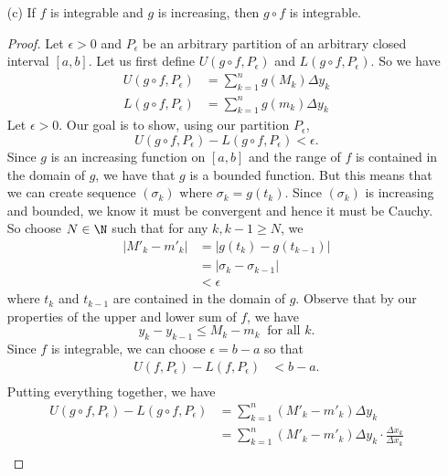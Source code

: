 \begin{enumerate}
	\item[(c)] If \( f  \) is integrable and \( g  \) is increasing, then \( g \circ f  \) is integrable.
		\begin{proof}
			Let \( \epsilon > 0 \) and \( P_{\epsilon } \) be an arbitrary partition of an arbitrary closed interval \( [a,b] \). Let us first define \( U(g \circ f , P_{\epsilon }) \) and \( L(g \circ f, P_{\epsilon }) \). So we have 
		\begin{align*}
		    U(g \circ f, P_{\epsilon }) &= \sum_{ k=1 }^{ n } g(M_{k}) \Delta y_{ k }   \\
							L(g \circ f, P_{\epsilon })			&= \sum_{ k=1 }^{ n } g(m_{k }) \Delta y_{k }
		\end{align*}
 Let \( \epsilon > 0  \).  Our goal is to show, using our partition \( P_{\epsilon } \), 
		\[ U(g \circ f, P_{\epsilon }) - L(g \circ f, P_{\epsilon }) < \epsilon.  \] Since \( g  \) is an increasing function on \( [a,b] \) and the range of \( f  \) is contained in the domain of \( g  \), we have that \( g  \) is a bounded function. But this means that we can create sequence \( (\sigma_{k } ) \) where \( \sigma_{k } = g(t_{k }) \). Since \( (\sigma_{k }) \) is increasing and bounded, we know it must be convergent and hence it must be Cauchy. So choose \( N \in \N  \) such that for any \( k,k-1 \geq N  \), we 
		\begin{align*}
		    | M'_{k} - m'_{k}   | &= | g(t_{k}) - g(t_{k-1}) | \\ 
								  &= | \sigma_{k} - \sigma_{k-1} | \\ 
									   &< \epsilon
		\end{align*}
		where \( t_{k} \) and \( t_{k-1}  \) are contained in the domain of \( g \).
	Observe that by our properties of the upper and lower sum of \( f  \), we have 
	\[ y_{k} - y_{k-1} \leq M_{k} - m_{k } \ \text{ for all } k.  \]
	Since \( f  \) is integrable, we can choose \( \epsilon = b -a  \) so that
	\begin{align*}
	    U(f, P_{\epsilon }) - L(f, P_{\epsilon }) &< b - a . \\
	\end{align*}
	Putting everything together, we have 
	\begin{align*}
	    U(g \circ f, P_{\epsilon }) - L(g \circ f, P_{\epsilon }) &= \sum_{ k=1 }^{ n } (M'_{k} - m'_{k}) \Delta y_{k} \\
								&= \sum_{ k=1 }^{ n } (M'_{k} - m'_{k }) \Delta y_{k} \cdot  \frac{ \Delta x_{k }  }{  \Delta x_{k } } \\ 

\end{align*}
\end{proof}
\end{enumerate}
